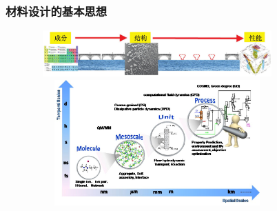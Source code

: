 \frame
{
	\frametitle{材料设计的基本思想}
\begin{figure}[h!]
\vspace*{-0.20in}
\centering
\includegraphics[height=0.70in,width=3.75in]{Figures/MGE-2.png}
\includegraphics[height=1.90in,width=3.75in,viewport=-120 0 775 480,clip]{Figures/Multi_Scale-2.jpeg}
\label{MGE}
\end{figure}
{\fontsize{7.2pt}{5.0pt}}
}

